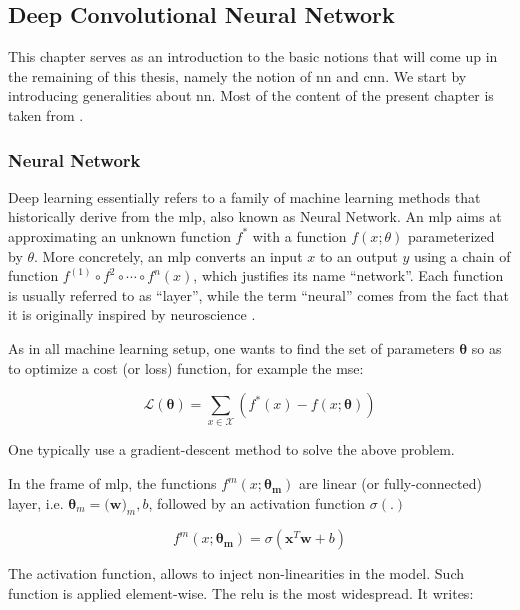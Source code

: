 \subsection{Deep Convolutional Neural Network}
\label{sec:cnn}

This chapter serves as an introduction to the basic notions that will come up in the remaining of this thesis, namely the notion of \gls{nn} and \gls{cnn}.
We start by introducing generalities about \gls{nn}.
Most of the content of the present chapter is taken from \cite{goodfellow16}.

\subsubsection{Neural Network}
Deep learning essentially refers to a family of machine learning methods that historically derive from the \gls{mlp}, also known as Neural Network.
An \gls{mlp} aims at approximating an unknown function $f^{*}$ with a function $f(x;\theta)$ parameterized by $\theta$.
More concretely, an \gls{mlp} converts an input $x$ to an output $y$ using a chain of function $f^{(1)} \circ f^{2} \circ \cdots \circ f^{n}(x)$, which justifies its name ``network''.
Each function is usually referred to as ``layer'', while the term ``neural'' comes from the fact that it is originally inspired by neuroscience \cite{mcculloch43}.

As in all machine learning setup, one wants to find the set of parameters $\bm{\theta}$ so as to optimize a cost (or loss) function, for example the \gls{mse}:

\begin{equation}
\mathcal{L}(\bm{\theta}) = \sum_{x\in \mathcal{X}}(f^{*}(x)-f(x;\bm{\theta}))
\end{equation}

One typically use a gradient-descent method to solve the above problem.

In the frame of \gls{mlp}, the functions $f^{m}(x;\bm{\theta_{m}})$ are linear (or fully-connected) layer, i.e. $\bm{\theta}_m=(\bm{w)}_{m},b$, followed by an activation function $\sigma(.)$

\begin{equation}
f^{m}(x;\bm{\theta_{m}}) = \sigma(\bm{x}^{T}\bm{w} + b)
\end{equation}

The activation function, allows to inject non-linearities in the model.
Such function is applied element-wise.
The \gls{relu} is the most widespread.
It writes:


